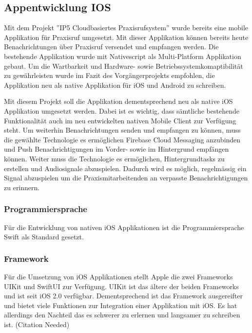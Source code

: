 
\subsection{Appentwicklung IOS}

Mit dem Projekt ''IP5 Cloudbasiertes Praxisrufsystem''\cite{ip5} wurde bereits eine mobile Applikation für Praxisruf umgesetzt.
Mit dieser Applikation können bereits heute Benachrichtungen über Praxisruf versendet und empfangen werden.
Die bestehende Applikation wurde mit Nativescript als Multi-Platform Applikation gebaut.
Um die Wartbarkeit und Hardware- sowie Betriebssystemkomaptibilität zu gewährleisten wurde im Fazit des Vorgängerprojekts empfohlen,
die Applikation neu als native Applikation für iOS und Android zu schreiben.\cite{ip5}

Mit diesem Projekt soll die Applikation dementsprechend neu als native iOS Applikation umgesetzt werden.
Dabei ist es wichtig, dass sämtliche bestehende Funktionalität auch im neu entwickelten nativen Mobile Client zur Verfügung steht.
Um weiterhin Benachrichtungen senden und empfangen zu können, muss die gewählte Technologie es ermöglichen Firebase Cloud Messaging anzubinden
und Push Benachrichtigungen im Vorder- sowie im Hintergrund empfängen können.
Weiter muss die Technologie es ermöglichen, Hintergrundtasks zu erstellen und Audiosignale abzuspielen.
Dadurch wird es möglich, regelmässig ein Signal abzuspielen um die Praxismitarbeitenden an verpasste Benachrichtigungen zu erinnern.

\subsubsection*{Programmiersprache}

Für die Entwicklung von nativen iOS Applikationen ist die Programmiersprache Swift als Standard gesetzt.\cite{ios_swift}


\subsubsection*{Framework}

Für die Umsetzung von iOS Applikationen stellt Apple die zwei Frameworks UIKit\cite{ios_uikit} und SwiftUI\cite{ios_swift_ui} zur Verfügung.
UIKit ist das ältere der beiden Frameworks und ist seit iOS 2.0 verfügbar.
Dementsprechend ist das Framework ausgereifter und bietet viele Funktionen zur Integration einer Applikation mit iOS.
Es hat allerdings den Nachteil das es schwerer zu erlernen und langsamer zu schreiben ist. (Citation Needed)

